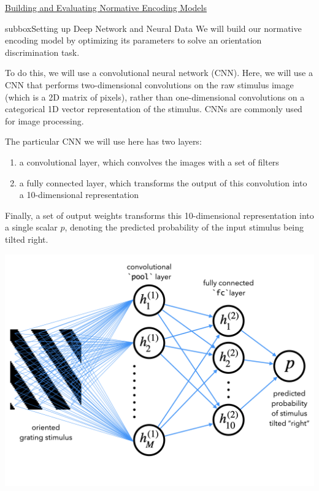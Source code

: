 \begin{textbox}{\href{https://compneuro.neuromatch.io/tutorials/W1D5_DeepLearning/student/W1D5_Tutorial3.html}{Building and Evaluating Normative Encoding Models } }
\begin{subbox}{subbox}{Setting up Deep Network and Neural Data}
\scriptsize
We will build our normative encoding model by optimizing its parameters to solve an orientation discrimination task. 

To do this, we will use a convolutional neural network (CNN). Here, we will use a CNN that performs two-dimensional convolutions on the raw stimulus image (which is a 2D matrix of pixels), rather than one-dimensional convolutions on a categorical 1D vector representation of the stimulus. CNNs are commonly used for image processing. 

The particular CNN we will use here has two layers:
\begin{enumerate}
    \item 
a convolutional layer, which convolves the images with a set of filters
    \item a fully connected layer, which transforms the output of this convolution into a 10-dimensional representation
\end{enumerate}

Finally, a set of output weights transforms this 10-dimensional representation into a single scalar $p$, denoting the predicted probability of the input stimulus being tilted right. 

\centering
\includegraphics[scale=0.18]{Figures/DL/DLFigure4.png}

\end{subbox}
\end{textbox}
